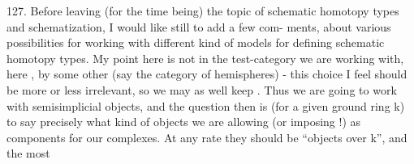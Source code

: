 127. Before leaving (for the time being) the topic of schematic
homotopy types and schem\-a\-ti\-za\-tion, I would like still to add a few com-%
 ments, about various possibilities for working with different kind
of models for defining schematic homotopy types. My point here is not
in  the  test-category we are working with, here \hand{$\Delta$} , by some
other (say the category \hand{\unsure{$\bigcirc$}} of  hemispheres) -  this choice I
feel should be more or less irrelevant, so we may as well keep \hand{$\Delta$} .
Thus we are going to work with semisimplicial objects, and the  
question then is (for a given ground ring k) to say  precisely what
kind of objects we are allowing (or imposing !) as components for our
complexes. At any rate they should be ``objects over k'', and the most


